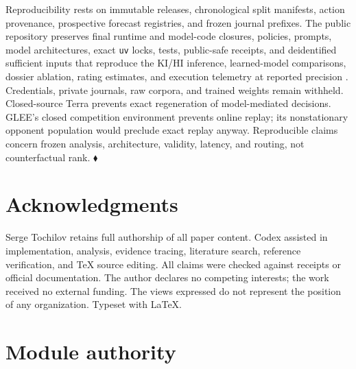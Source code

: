 \documentclass{article}
\begin{document}
Reproducibility rests on immutable releases, chronological split manifests, action provenance, prospective forecast registries, and frozen journal prefixes. The public repository preserves final runtime and model-code closures, policies, prompts, model architectures, exact \texttt{uv} locks, tests, public-safe receipts, and deidentified sufficient inputs that reproduce the KI/HI inference, learned-model comparisons, dossier ablation, rating estimates, and execution telemetry at reported precision \citep{tochilov2026deeprmmglee}. Credentials, private journals, raw corpora, and trained weights remain withheld. Closed-source Terra prevents exact regeneration of model-mediated decisions. GLEE's closed competition environment prevents online replay; its nonstationary opponent population would preclude exact replay anyway. Reproducible claims concern frozen analysis, architecture, validity, latency, and routing, not counterfactual rank. $\blacklozenge$

\section*{Acknowledgments}

Serge Tochilov retains full authorship of all paper content. Codex assisted in implementation, analysis, evidence tracing, literature search, reference verification, and TeX source editing. All claims were checked against receipts or official documentation. The author declares no competing interests; the work received no external funding. The views expressed do not represent the position of any organization. Typeset with \LaTeX{}.

\appendix
\renewcommand{\thetable}{A\arabic{table}}
\renewcommand{\theHtable}{A\arabic{table}}
\setcounter{table}{0}
\section{Module authority}
\label{app:authority}
\end{document}
